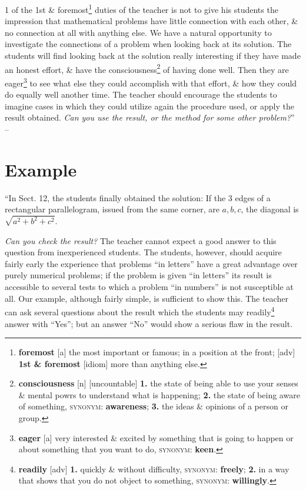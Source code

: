\documentclass[oneside]{book}
\numberwithin{equation}{section}
\begin{document}
1 of the 1st \& foremost\footnote{\textbf{foremost} [a] the most important or famous; in a position at the front; [adv] \textbf{1st \& foremost} [idiom] more than anything else.} duties of the teacher is not to give his students the impression that mathematical problems have little connection with each other, \& no connection at all with anything else. We have a natural opportunity to investigate the connections of a problem when looking back at its solution. The students will find looking back at the solution really interesting if they have made an honest effort, \& have the consciousness\footnote{\textbf{consciousness} [n] [uncountable] \textbf{1.} the state of being able to use your senses \& mental powrs to understand what is happening; \textbf{2.} the state of being aware of something, \textsc{synonym}: \textbf{awareness}; \textbf{3.} the ideas \& opinions of a person or group.} of having done well. Then they are eager\footnote{\textbf{eager} [a] very interested \& excited by something that is going to happen or about something that you want to do, \textsc{synonym}: \textbf{keen}.} to see what else they could accomplish with that effort, \& how they could do equally well another time. The teacher should encourage the students to imagine cases in which they could utilize again the procedure used, or apply the result obtained. \textit{Can you use the result, or the method for some other problem?}'' -- \cite[pp. 14--16]{Polya2014}

\section{Example}
``In Sect. 12, the students finally obtained the solution: If the 3 edges of a rectangular parallelogram, issued from the same corner, are $a,b,c$, the diagonal is $\sqrt{a^2 + b^2 + c^2}$.

\textit{Can you check the result?} The teacher cannot expect a good answer to this question from inexperienced students. The students, however, should acquire fairly early the experience that problems ``in letters'' have a great advantage over purely numerical problems; if the problem is given ``in letters'' its result is accessible to several tests to which a problem ``in numbers'' is not susceptible at all. Our example, although fairly simple, is sufficient to show this. The teacher can ask several questions about the result which the students may readily\footnote{\textbf{readily} [adv] \textbf{1.} quickly \& without difficulty, \textsc{synonym}: \textbf{freely}; \textbf{2.} in a way that shows that you do not object to something, \textsc{synonym}: \textbf{willingly}.} answer with ``Yes''; but an answer ``No'' would show a serious flaw in the result.
\end{document}
